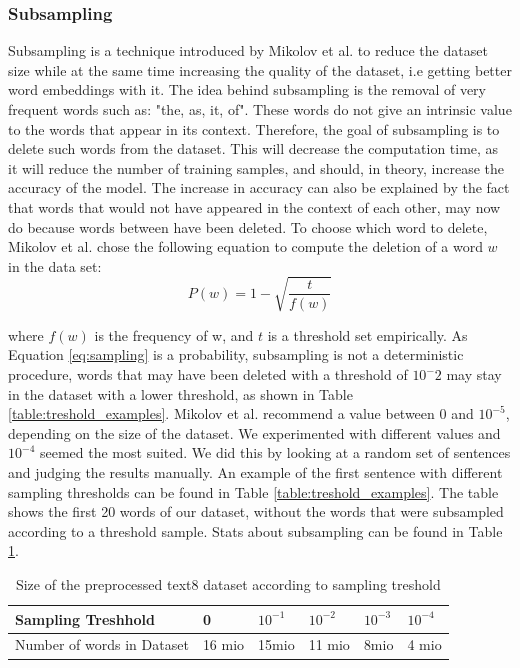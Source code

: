 \documentclass[conference]{IEEEtran}
\begin{document}
\subsubsection{Subsampling}
Subsampling is a technique introduced by Mikolov et al. \cite{mikolov} to reduce the dataset size while at the same time increasing the quality of the dataset, i.e getting better word embeddings with it. The idea behind subsampling is the removal of very frequent words such as: "the, as, it, of". These words do not give an intrinsic value to the words that appear in its context. Therefore, the goal of subsampling is to delete such words from the dataset. This will decrease the computation time, as it will reduce the number of training samples, and should, in theory, increase the accuracy of the model. The increase in accuracy can also be explained by the fact that words that would not have appeared in the context of each other, may now do because words between have been deleted.
To choose which word to delete, Mikolov et al. \cite{mikolov2} chose the following equation to compute the deletion of a word $w$ in the data set:
\begin{equation} \label{eq:sampling}
P(w) = 1- \sqrt{{\frac{t}{f(w)}}}
\end{equation}

where $f(w)$ is the frequency of w, and $t$ is a threshold set empirically. As Equation \ref{eq:sampling} is a probability, subsampling is not a deterministic procedure, words that may have been deleted with a threshold of $10^-2$ may stay in the dataset with a lower threshold, as shown in Table \ref{table:treshold_examples}. Mikolov et al. recommend a value between $0$ and $10^{-5}$, depending on the size of the dataset. We experimented with different values and $10^{-4}$ seemed the most suited. We did this by looking at a random set of sentences and judging the results manually. An example of the first sentence with different sampling thresholds can be found in Table \ref{table:treshold_examples}. The table shows the first 20 words of our dataset, without the words that were subsampled according to a threshold sample. Stats about subsampling can be found in Table \ref{table:treshold}.
\begin{table}[h]
\centering
\begin{tabular}{|l|l|l|l|l|l|}
\hline
Sampling Treshhold & 0 & $ 10^{-1}$&$ 10^{-2}$& $10^{-3} $ &$10^{-4} $ \\ \hline
Number of words in Dataset & 16 mio & 15mio & 11 mio & 8mio & 4 mio \\ \hline
\end{tabular}
\caption{Size of the preprocessed text8 dataset according to sampling treshold}
\label{table:treshold}
\end{table}
\end{document}
